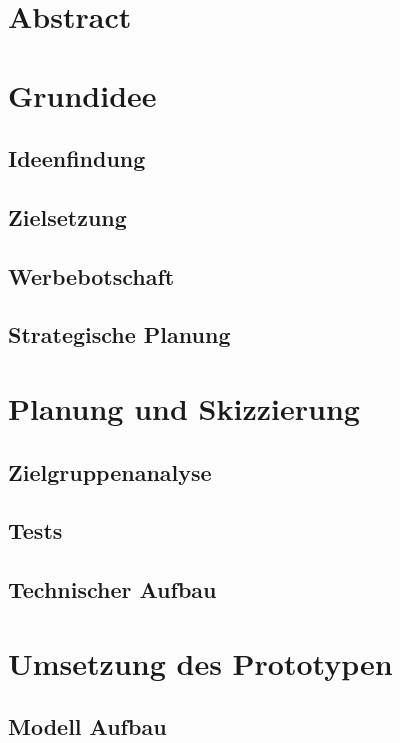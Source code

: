 






\section*{Abstract}


\tableofcontents
\clearpage



\section{Grundidee}
\subsection{Ideenfindung}
\subsection{Zielsetzung}
\subsection{Werbebotschaft}
\subsection{Strategische Planung}

\section{Planung und Skizzierung}
\subsection{Zielgruppenanalyse}
\subsection{Tests}
\subsection{Technischer Aufbau}

\section{Umsetzung des Prototypen}
\subsection{Modell Aufbau}
